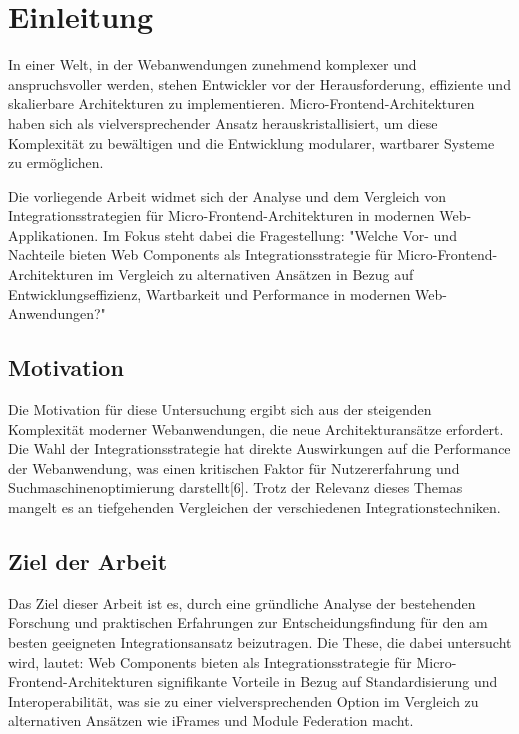 \chapter{Einleitung}
\label{ch:intro}
In einer Welt, in der Webanwendungen zunehmend komplexer und anspruchsvoller werden, stehen Entwickler vor der Herausforderung, effiziente und skalierbare Architekturen zu implementieren. Micro-Frontend-Architekturen haben sich als vielversprechender Ansatz herauskristallisiert, um diese Komplexität zu bewältigen und die Entwicklung modularer, wartbarer Systeme zu ermöglichen. \cite{10.1145/3561846.3561853}

Die vorliegende Arbeit widmet sich der Analyse und dem Vergleich von Integrationsstrategien für Micro-Frontend-Architekturen in modernen Web-Applikationen. Im Fokus steht dabei die Fragestellung: "Welche Vor- und Nachteile bieten Web Components als Integrationsstrategie für Micro-Frontend-Architekturen im Vergleich zu alternativen Ansätzen in Bezug auf Entwicklungseffizienz, Wartbarkeit und Performance in modernen Web-Anwendungen?"


%
%
\section{Motivation}
\label{sec:intro:motivation}
Die Motivation für diese Untersuchung ergibt sich aus der steigenden Komplexität moderner Webanwendungen, die neue Architekturansätze erfordert. Die Wahl der Integrationsstrategie hat direkte Auswirkungen auf die Performance der Webanwendung, was einen kritischen Faktor für Nutzererfahrung und Suchmaschinenoptimierung darstellt[6]. Trotz der Relevanz dieses Themas mangelt es an tiefgehenden Vergleichen der verschiedenen Integrationstechniken.
%
%
\section{Ziel der Arbeit}
\label{sec:intro:goal}
Das Ziel dieser Arbeit ist es, durch eine gründliche Analyse der bestehenden Forschung und praktischen Erfahrungen zur Entscheidungsfindung für den am besten geeigneten Integrationsansatz beizutragen. Die These, die dabei untersucht wird, lautet: Web Components bieten als Integrationsstrategie für Micro-Frontend-Architekturen signifikante Vorteile in Bezug auf Standardisierung und Interoperabilität, was sie zu einer vielversprechenden Option im Vergleich zu alternativen Ansätzen wie iFrames und Module Federation macht.

